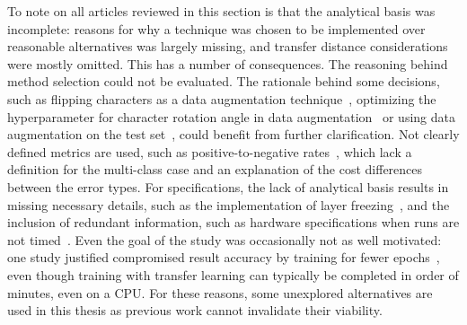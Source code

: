 \documentclass[english,twoside,openright]{UH_DS_MSc}
\begin{document}
To note on all articles reviewed in this section is that the analytical basis was incomplete: reasons for why a technique 
was chosen to be implemented over reasonable alternatives was largely missing, and transfer distance considerations were 
mostly omitted. This has a number of consequences. The reasoning behind method selection could not be evaluated. The rationale 
behind some decisions, such as flipping characters as a data augmentation technique~\cite{9thuonPalm}, optimizing the hyperparameter for character
 rotation angle in data augmentation~\cite{7rizkybasicCnnTransfer} or using data augmentation on the test set~\cite{11zunairUnconventionalWisdom}, could benefit from 
 further clarification. Not clearly defined metrics are used, such as positive-to-negative rates~\cite{10goelGujarati, 5rasheedHandwrittenUrduWAlexNet}, which lack a definition for 
 the multi-class case and an explanation of the cost differences between the error types. For specifications, the lack of analytical
  basis results in missing necessary details, such as the implementation of layer freezing~\cite{8goelGujarati2023}, and the inclusion of redundant information,
   such as hardware specifications when runs are not timed~\cite{9thuonPalm}. Even the goal of the study was occasionally not as well motivated: one 
   study justified compromised result accuracy by training for fewer epochs~\cite{3chatterjeeBengali}, even though training with transfer learning can typically 
   be completed in order of minutes, even on a CPU. For these reasons, some unexplored alternatives are used in this
    thesis as previous work cannot invalidate their viability.




\end{document}
